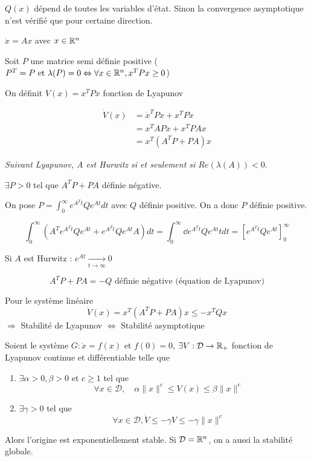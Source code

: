 \documentclass[main.tex]{subfiles} \newcommand{\D}{\mathcal{D}}
\begin{document}
\begin{rem} $Q(x)$ dépend de toutes les variables d'état. Sinon la convergence
asymptotique n'est vérifié que pour certaine direction.  \end{rem}


\begin{exemple}

  $\dot{x}=Ax$ avec $x\in \mathbb{R}^n$

  Soit $P$ une matrice semi définie positive ($P^T = P \text{ et } \lambda(P) =
	0 \Leftrightarrow \forall x\in \mathbb{R}^n, x^T P x \geq 0$)

  On définit $V(x) = x^TPx$ fonction de Lyapunov

  \begin{align*} \dot{V}(x) & = \dot{x}^T P x + x^T P \dot{x} \\ & = x^T APx +
  x^T PAx \\&= x^T(A^TP + PA)x \end{align*}

  \emph{Suivant Lyapunov, A est Hurwitz si et seulement si $Re(\lambda(A)) <
	0$}.

  $\exists P > 0 \text{ tel que } A^TP + PA$ définie négative.

  On pose $P = \int_0^{\infty} e^{A^Tt}Qe^{At} dt$ avec $Q$ définie positive.
	On a donc $P$ définie positive.

  \[ \int_0^{\infty} (A^T e^{A^Tt} Q e^{At} + e^{A^T t} Q e^{At} A)dt =
	\int_0^{\infty} \dd{e^{A^Tt} Q e^{At}}{t} dt =
	\left[e^{A^Tt}Qe^{At}\right]_0^{\infty}\]

  Si $A$ est Hurwitz : $e^{At} \xrightarrow[t\rightarrow \infty]{} 0$

  \[A^T P + PA = -Q \text{ définie négative (équation de Lyapunov)} \]

  Pour le système linéaire \[ \dot{V}(x) = x^T (A^T P + PA)x \leq -x^T Q x\]
	$\Rightarrow$ Stabilité de Lyapunov $\Leftrightarrow$ Stabilité
	asymptotique

\end{exemple}

\begin{thm} Soient le système $G: \dot{x}=f(x)$ et
$f(0)=0$, $\exists V : \D \rightarrow \R_+$ fonction de Lyapunov continue et
différentiable telle que \begin{enumerate} \item $\exists \alpha > 0, \beta >
			0$ et $c\geq 1$ tel que \[ \quad \forall x \in \D, \quad \alpha
\|x\|^c \leq V(x) \leq \beta \|x\|^c\] \item $\exists \gamma > 0$ tel que \[
\quad \forall x \in \D, \dot{V} \leq - \gamma V \leq - \gamma \|x\|^c \]
\end{enumerate} Alors l'origine est exponentiellement stable. Si $\D=\R^n$, on
	a aussi la stabilité globale.  \end{thm}
\end{document}
